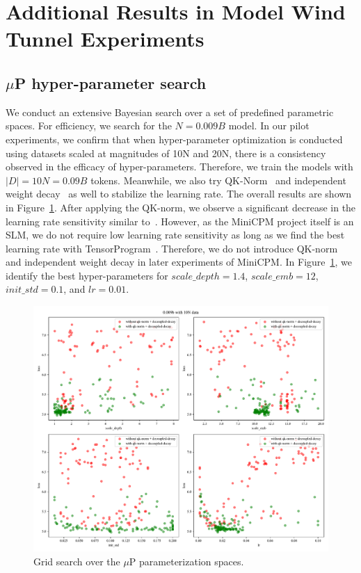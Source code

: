 



\section{Additional Results in Model Wind Tunnel Experiments}

\subsection{$\mu$P hyper-parameter search}
\label{app:bayesiansearch}
We conduct an extensive Bayesian search over a set of predefined parametric spaces. For efficiency, we search for the $N=0.009B$ model. In our pilot experiments, we confirm that when hyper-parameter optimization is conducted using datasets scaled at magnitudes of 10N and 20N, there is a consistency observed in the efficacy of hyper-parameters. Therefore, we train the models with $|D| = 10N = 0.09B$ tokens.
Meanwhile, we also try QK-Norm~\citep{henry-etal-2020-query} and independent weight decay~\citep{loshchilov2017decoupled} as well to stabilize the learning rate. The overall results are shown in Figure~\ref{fig:mupsearch_app}. After applying the QK-norm, we observe a significant decrease in the learning rate sensitivity similar to~\cite{wortsman2023small}. However, as the MiniCPM project itself is an SLM, we do not require low learning rate sensitivity as long as we find the best learning rate with TensorProgram~\citep{yang2022tensor, yang2023tensor}. Therefore, we do not introduce QK-norm and independent weight decay in later experiments of MiniCPM. In Figure~\ref{fig:mupsearch_app}, we identify the best hyper-parameters for $scale\_depth=1.4$, $scale\_emb=12$, $init\_std=0.1$, and $lr=0.01$. 


\begin{figure}[htbp]
    \centering
    \includegraphics[width=0.65\linewidth]{Fig/mup0.009bwith10Ndata.pdf}
    \caption{Grid search over the $\mu$P parameterization spaces.}
    \label{fig:mupsearch_app}
\end{figure}


